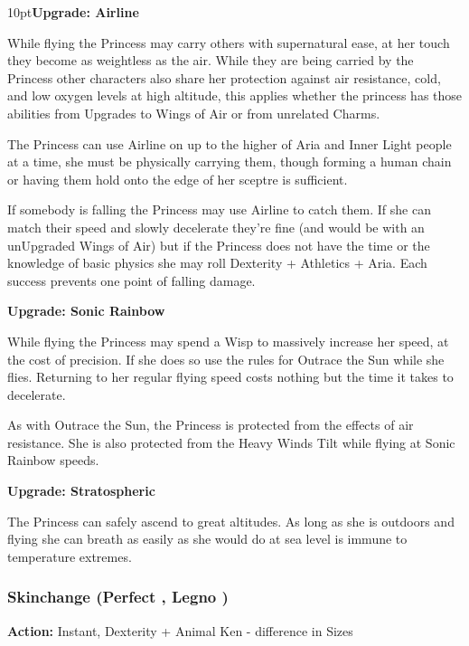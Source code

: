 \begin{myindentpar}{10pt}\textbf{Upgrade: Airline}

While flying the Princess may carry others with supernatural ease, at her touch they become as weightless as the air. While they are being carried by the Princess other characters also share her protection against air resistance, cold, and low oxygen levels at high altitude, this applies whether the princess has those abilities from Upgrades to Wings of Air or from unrelated Charms.

The Princess can use Airline on up to the higher of Aria and Inner Light people at a time, she must be physically carrying them, though forming a human chain or having them hold onto the edge of her sceptre is sufficient. 

If somebody is falling the Princess may use Airline to catch them. If she can match their speed and slowly decelerate they're fine (and would be with an unUpgraded Wings of Air) but if the Princess does not have the time or the knowledge of basic physics she may roll Dexterity + Athletics + Aria. Each success prevents one point of falling damage. 

\textbf{Upgrade: Sonic Rainbow}

While flying the Princess may spend a Wisp to massively increase her speed, at the cost of precision. If she does so use the rules for Outrace the Sun while she flies. Returning to her regular flying speed costs nothing but the time it takes to decelerate.

As with Outrace the Sun, the Princess is protected from the effects of air resistance. She is also protected from the Heavy Winds Tilt while flying at Sonic Rainbow speeds. 

\textbf{Upgrade: Stratospheric}

The Princess can safely ascend to great altitudes. As long as she is outdoors and flying she can breath as easily as she would do at sea level is immune to temperature extremes. 

\end{myindentpar}

\subsubsection*{Skinchange (Perfect \textbullet\textbullet\textbullet\textbullet, Legno  \textbullet\textbullet\textbullet)}

\noindent \textbf{Action:} Instant, Dexterity + Animal Ken - difference in Sizes

